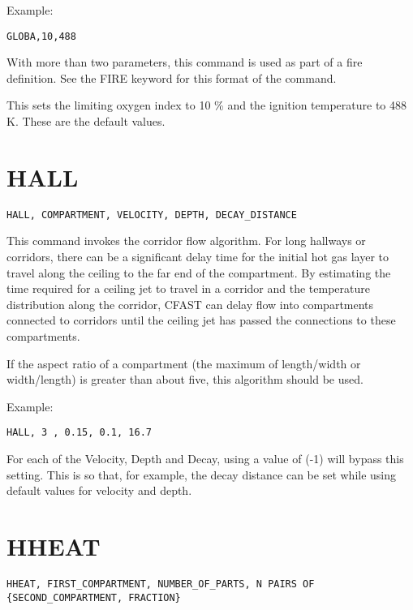 Example:

\begin{lstlisting}
GLOBA,10,488
\end{lstlisting}

With more than two parameters, this command is used as part of a fire definition.  See the FIRE keyword for this format of the command.

This sets the limiting oxygen index to 10 \% and the ignition temperature to 488 K. These are the default values.

\section{HALL}

\begin{lstlisting}
HALL, COMPARTMENT, VELOCITY, DEPTH, DECAY_DISTANCE
\end{lstlisting}

This command invokes the corridor flow algorithm. For long hallways or corridors, there can be a significant delay time for the initial hot gas layer to travel along the ceiling to the far end of the compartment. By estimating the time required for a ceiling jet to travel in a corridor and the temperature distribution along the corridor, CFAST can delay flow into compartments connected to corridors until the ceiling jet has passed the connections to these compartments.

If the aspect ratio of a compartment (the maximum of length/width or width/length) is greater than about five, this algorithm should be used.

Example:

\begin{lstlisting}
HALL, 3 , 0.15, 0.1, 16.7
\end{lstlisting}

For each of the Velocity, Depth and Decay, using a value of (-1) will bypass this setting. This is so that, for example, the decay distance can be set while using default values for velocity and depth.

\section{HHEAT}

\begin{lstlisting}
HHEAT, FIRST_COMPARTMENT, NUMBER_OF_PARTS, N PAIRS OF {SECOND_COMPARTMENT, FRACTION}
\end{lstlisting}

